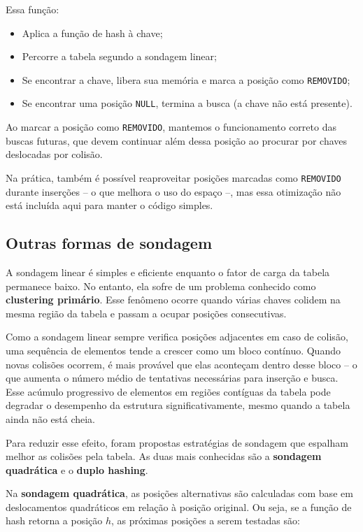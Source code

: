 Essa função:

\begin{itemize}
  \item Aplica a função de hash à chave;
  \item Percorre a tabela segundo a sondagem linear;
  \item Se encontrar a chave, libera sua memória e marca a posição como \texttt{REMOVIDO};
  \item Se encontrar uma posição \texttt{NULL}, termina a busca (a chave não está presente).
\end{itemize}

Ao marcar a posição como \texttt{REMOVIDO}, mantemos o funcionamento correto das buscas futuras, que devem continuar além dessa posição ao procurar por chaves deslocadas por colisão.

Na prática, também é possível reaproveitar posições marcadas como \texttt{REMOVIDO} durante inserções -- o que melhora o uso do espaço --, mas essa otimização não está incluída aqui para manter o código simples.

\subsection*{Outras formas de sondagem}

A sondagem linear é simples e eficiente enquanto o fator de carga da tabela permanece baixo. 
No entanto, ela sofre de um problema conhecido como \textbf{clustering primário}. 
Esse fenômeno ocorre quando várias chaves colidem na mesma região da tabela e passam a ocupar posições consecutivas.

Como a sondagem linear sempre verifica posições adjacentes em caso de colisão, uma sequência de elementos tende a crescer como um bloco contínuo. 
Quando novas colisões ocorrem, é mais provável que elas aconteçam dentro desse bloco -- o que aumenta o número médio de tentativas necessárias para inserção e busca. 
Esse acúmulo progressivo de elementos em regiões contíguas da tabela pode degradar o desempenho da estrutura significativamente, mesmo quando a tabela ainda não está cheia.

Para reduzir esse efeito, foram propostas estratégias de sondagem que espalham melhor as colisões pela tabela. 
As duas mais conhecidas são a \textbf{sondagem quadrática} e o \textbf{duplo hashing}.

Na \textbf{sondagem quadrática}, as posições alternativas são calculadas com base em deslocamentos quadráticos em relação à posição original. 
Ou seja, se a função de hash retorna a posição $h$, as próximas posições a serem testadas são:

